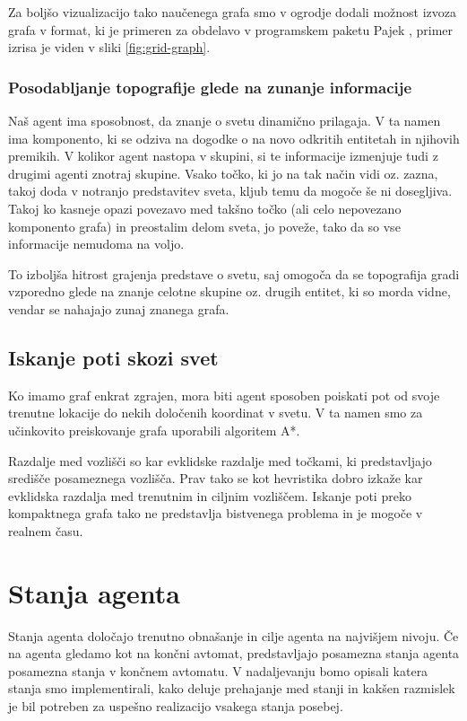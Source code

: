 \documentclass[a4paper,10pt]{article}
\begin{document}
Za boljšo vizualizacijo tako naučenega grafa smo v ogrodje dodali možnost izvoza grafa v format, ki je primeren za obdelavo v programskem paketu Pajek \cite{batagelj97}, primer izrisa je viden v sliki \ref{fig:grid-graph}.

\subsubsection{Posodabljanje topografije glede na zunanje informacije}

Naš agent ima sposobnost, da znanje o svetu dinamično prilagaja. V ta namen ima komponento, ki se odziva na dogodke o na novo odkritih entitetah in njihovih premikih. V kolikor agent nastopa v skupini, si te informacije izmenjuje tudi z drugimi agenti znotraj skupine. Vsako točko, ki jo na tak način vidi oz. zazna, takoj doda v notranjo predstavitev sveta, kljub temu da mogoče še ni dosegljiva. Takoj ko kasneje opazi povezavo med takšno točko (ali celo nepovezano komponento grafa) in preostalim delom sveta, jo poveže, tako da so vse informacije nemudoma na voljo.

To izboljša hitrost grajenja predstave o svetu, saj omogoča da se topografija gradi vzporedno glede na znanje celotne skupine oz. drugih entitet, ki so morda vidne, vendar se nahajajo zunaj znanega grafa.

\subsection{Iskanje poti skozi svet}

Ko imamo graf enkrat zgrajen, mora biti agent sposoben poiskati pot od svoje trenutne lokacije do nekih določenih koordinat v svetu. V ta namen smo za učinkovito preiskovanje grafa uporabili algoritem A*.

Razdalje med vozlišči so kar evklidske razdalje med točkami, ki predstavljajo središče posameznega vozlišča. Prav tako se kot hevristika dobro izkaže kar evklidska razdalja med trenutnim in ciljnim vozliščem. Iskanje poti preko kompaktnega grafa tako ne predstavlja bistvenega problema in je mogoče v realnem času.

\section{Stanja agenta} \label{sec:stanja-agenta}
Stanja agenta določajo trenutno obnašanje in cilje agenta na najvišjem nivoju. Če na agenta gledamo kot na končni avtomat, predstavljajo posamezna stanja agenta posamezna stanja v končnem avtomatu. V nadaljevanju bomo opisali katera stanja smo implementirali, kako deluje prehajanje med stanji in kakšen razmislek je bil potreben za uspešno realizacijo vsakega stanja posebej.
\end{document}
